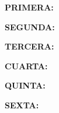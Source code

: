 %
%
%



\textbf{PRIMERA:}

\textbf{SEGUNDA:}

\textbf{TERCERA:}

\textbf{CUARTA:}

\textbf{QUINTA:}

\textbf{SEXTA:}


